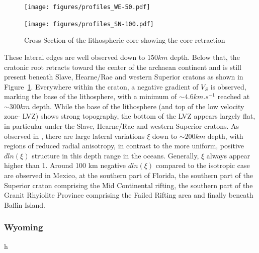 \documentclass[12pt]{article}
\begin{document}
\begin{figure}
	\begin{minipage}{0.5\linewidth}
		\centerline{\texttt{[image: figures/profiles\_WE-50.pdf]}}
	\end{minipage}
	\hfill
	\begin{minipage}{0.5\linewidth}
		\centerline{\texttt{[image: figures/profiles\_SN-100.pdf]}}
	\end{minipage}

	\caption{Cross Section of the lithospheric core showing the core retraction}
	\label{cratoncrossedge}

\end{figure}

These lateral edges are well observed down to $150km$ depth. Below that, the cratonic root retracts toward the center of the archaean continent and is still present beneath Slave, Hearne/Rae and western Superior cratons as shown in Figure~\ref{cratoncrossedge}. 
Everywhere within the craton, a negative gradient of $V_S$ is observed, marking the base of the lithosphere, with a minimum of $\sim 4.6km.s^{-1}$ reached at $\sim 300km$ depth. While the base of the lithosphere (and top of the low velocity zone- LVZ) shows strong topography, the bottom of the LVZ appears largely flat, in particular under the  Slave, Hearne/Rae and western Superior cratons.
As observed in \cite{babuvska1998age,gung2003global,yuan2014lithospheric}, there are large lateral variations  $\xi$ down to $\sim 200km$ depth, with regions of reduced radial anisotropy, in contrast to the more uniform, positive $dln(\xi)$ structure in this depth range in the oceans. Generally, $\xi$ always appear higher than 1. Around 100 km negative $dln(\xi)$ compared to the isotropic case are observed in Mexico, at the southern part of Florida, the southern part of the Superior craton comprising the Mid Continental rifting, the southern part of the Granit Rhyiolite Province comprising the Failed Rifting area and finally beneath Baffin Island.


\subsubsection{Wyoming}{h}
\end{document}
